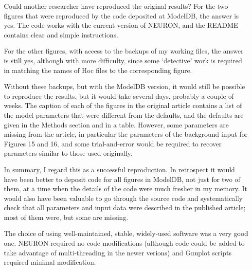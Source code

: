 Could another researcher have reproduced the original results?
For the two figures that were reproduced by the code deposited at ModelDB, the answer is yes.
The code works with the current version of NEURON, and the README contains clear and simple instructions.

For the other figures, with access to the backups of my working files, the answer is still yes, although with more difficulty,
since some `detective' work is required in matching the names of Hoc files to the corresponding figure.

Without these backups, but with the ModelDB version, it would still be possible to reproduce the results,
but it would take several days, probably a couple of weeks.
The caption of each of the figures in the original article contains a list of the model parameters that were different from the defaults,
and the defaults are given in the Methods section and in a table.
However, some parameters are missing from the article, in particular the parameters of the background input for Figures 15 and 16,
and some trial-and-error would be required to recover parameters similar to those used originally.


In summary, I regard this as a successful reproduction.
In retrospect it would have been better to deposit code for all figures in ModelDB, not just for two of them,
at a time when the details of the code were much fresher in my memory.
It would also have been valuable to go through the source code and systematically check that all parameters and input data
were described in the published article; most of them were, but some are missing.

The choice of using well-maintained, stable, widely-used software was a very good one.
NEURON required no code modifications (although code could be added to take advantage of multi-threading in the newer verions)
and Gnuplot scripts required minimal modification.
